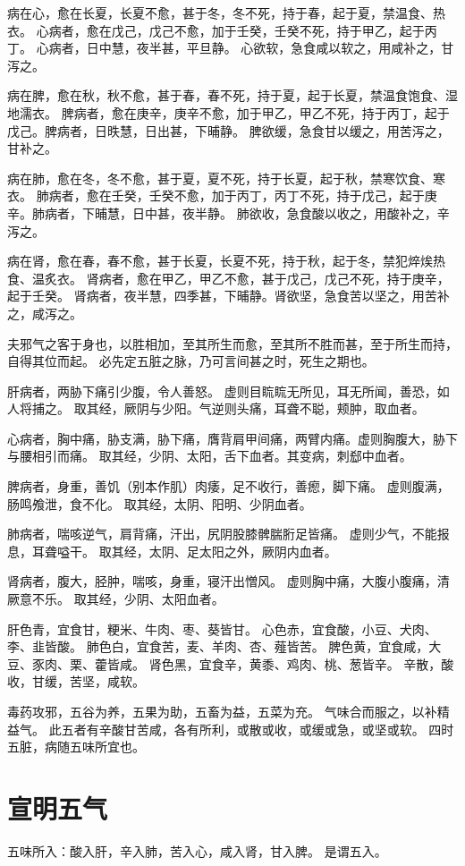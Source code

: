 \documentclass{article}%
\begin{document}
病在心，愈在长夏，长夏不愈，甚于冬，冬不死，持于春，起于夏，禁温食、热衣。
心病者，愈在戊己，戊己不愈，加于壬癸，壬癸不死，持于甲乙，起于丙丁。
心病者，日中慧，夜半甚，平旦静。
心欲软，急食咸以软之，用咸补之，甘泻之。

病在脾，愈在秋，秋不愈，甚于春，春不死，持于夏，起于长夏，禁温食饱食、湿地濡衣。
脾病者，愈在庚辛，庚辛不愈，加于甲乙，甲乙不死，持于丙丁，起于戊己。脾病者，日昳慧，日出甚，下晡静。
脾欲缓，急食甘以缓之，用苦泻之，甘补之。

病在肺，愈在冬，冬不愈，甚于夏，夏不死，持于长夏，起于秋，禁寒饮食、寒衣。
肺病者，愈在壬癸，壬癸不愈，加于丙丁，丙丁不死，持于戊己，起于庚辛。肺病者，下晡慧，日中甚，夜半静。
肺欲收，急食酸以收之，用酸补之，辛泻之。

病在肾，愈在春，春不愈，甚于长夏，长夏不死，持于秋，起于冬，禁犯焠㶼热食、温炙衣。
肾病者，愈在甲乙，甲乙不愈，甚于戊己，戊己不死，持于庚辛，起于壬癸。
肾病者，夜半慧，四季甚，下晡静。肾欲坚，急食苦以坚之，用苦补之，咸泻之。

夫邪气之客于身也，以胜相加，至其所生而愈，至其所不胜而甚，至于所生而持，自得其位而起。
必先定五脏之脉，乃可言间甚之时，死生之期也。

肝病者，两胁下痛引少腹，令人善怒。
虚则目䀮䀮无所见，耳无所闻，善恐，如人将捕之。
取其经，厥阴与少阳。气逆则头痛，耳聋不聪，颊肿，取血者。

心病者，胸中痛，胁支满，胁下痛，膺背肩甲间痛，两臂内痛。虚则胸腹大，胁下与腰相引而痛。
取其经，少阴、太阳，舌下血者。其变病，刺郄中血者。

脾病者，身重，善饥（别本作肌）肉痿，足不收行，善瘛，脚下痛。
虚则腹满，肠鸣飧泄，食不化。
取其经，太阴、阳明、少阴血者。

肺病者，喘咳逆气，肩背痛，汗出，尻阴股膝髀腨胻足皆痛。
虚则少气，不能报息，耳聋嗌干。
取其经，太阴、足太阳之外，厥阴内血者。

肾病者，腹大，胫肿，喘咳，身重，寝汗出憎风。
虚则胸中痛，大腹小腹痛，清厥意不乐。
取其经，少阴、太阳血者。

肝色青，宜食甘，粳米、牛肉、枣、葵皆甘。
心色赤，宜食酸，小豆、犬肉、李、韭皆酸。
肺色白，宜食苦，麦、羊肉、杏、薤皆苦。
脾色黄，宜食咸，大豆、豕肉、栗、藿皆咸。
肾色黑，宜食辛，黄黍、鸡肉、桃、葱皆辛。
辛散，酸收，甘缓，苦坚，咸软。

毒药攻邪，五谷为养，五果为助，五畜为益，五菜为充。
气味合而服之，以补精益气。
此五者有辛酸甘苦咸，各有所利，或散或收，或缓或急，或坚或软。
四时五脏，病随五味所宜也。


\section{宣明五气}
五味所入：酸入肝，辛入肺，苦入心，咸入肾，甘入脾。
是谓五入。
\end{document}
